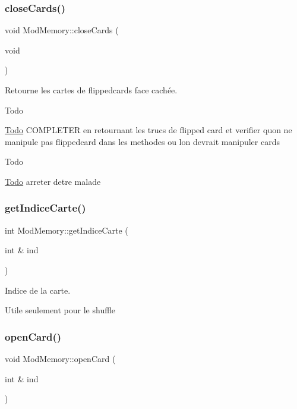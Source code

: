 \subsubsection{\texorpdfstring{close\+Cards()}{closeCards()}}
{\footnotesize\ttfamily void Mod\+Memory\+::close\+Cards (\begin{DoxyParamCaption}\item[{void}]{ }\end{DoxyParamCaption})}



Retourne les cartes de flippedcards face cachée. 

\begin{DoxyRefDesc}{Todo}
\item[\hyperlink{todo__todo000012}{Todo}]C\+O\+M\+P\+L\+E\+T\+ER en retournant les trucs de flipped card et verifier qu\textquotesingle{}on ne manipule pas flippedcard dans les methodes ou l\textquotesingle{}on devrait manipuler cards\end{DoxyRefDesc}


\begin{DoxyRefDesc}{Todo}
\item[\hyperlink{todo__todo000013}{Todo}]arreter d\textquotesingle{}etre malade \end{DoxyRefDesc}
\mbox{\label{class_mod_memory_a2ea383b6a13143c4f1f5fa9534e6faa6}} 
\subsubsection{\texorpdfstring{get\+Indice\+Carte()}{getIndiceCarte()}}
{\footnotesize\ttfamily int Mod\+Memory\+::get\+Indice\+Carte (\begin{DoxyParamCaption}\item[{int \&}]{ind }\end{DoxyParamCaption})}



Indice de la carte. 

Utile seulement pour le shuffle \mbox{\label{class_mod_memory_a5886105416521e463eeaf732e8a0f6fe}} 
\subsubsection{\texorpdfstring{open\+Card()}{openCard()}}
{\footnotesize\ttfamily void Mod\+Memory\+::open\+Card (\begin{DoxyParamCaption}\item[{int \&}]{ind }\end{DoxyParamCaption})}



